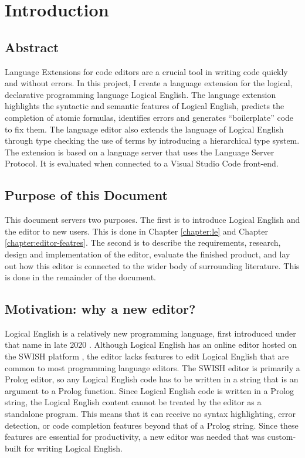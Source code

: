 \documentclass[../main.tex]{subfiles}
\begin{document}
\chapter{Introduction}
\section{Abstract}
Language Extensions for code editors are a crucial tool in writing code quickly and without errors. In this project, I create a language extension for the logical, declarative programming language Logical English. The language extension highlights the syntactic and semantic features of Logical English, predicts the completion of atomic formulas, identifies errors and generates ``boilerplate'' code to fix them. The language editor also extends the language of Logical English through type checking the use of terms by introducing a hierarchical type system. The extension is based on a language server that uses the Language Server Protocol. It is evaluated when connected to a Visual Studio Code front-end.

\section{Purpose of this Document}
This document servers two purposes. The first is to introduce Logical English and the editor to new users. This is done in Chapter \ref{chapter:le} and Chapter \ref{chapter:editor-featres}. The second is to describe the requirements, research, design and implementation of the editor, evaluate the finished product, and lay out how this editor is connected to the wider body of surrounding literature. This is done in the remainder of the document.

\section{Motivation: why a new editor?}
Logical English is a relatively new programming language, first introduced under that name in late 2020 \cite{logical_english}. Although Logical English has an online editor hosted on the SWISH platform \cite{swish_editor}, the editor lacks features to edit Logical English that are common to most programming language editors. The SWISH editor is primarily a Prolog editor, so any Logical English code has to be written in a string that is an argument to a Prolog function. Since Logical English code is written in a Prolog string, the Logical English content cannot be treated by the editor as a standalone program. This means that it can receive no syntax highlighting, error detection, or code completion features beyond that of a Prolog string. Since these features are essential for productivity, a new editor was needed that was custom-built for writing Logical English.
\end{document}
